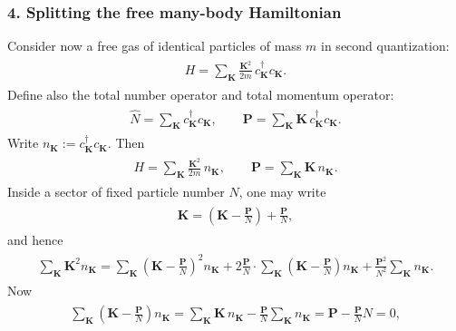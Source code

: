 \documentclass[../QFT_main.tex]{subfiles}
\begin{document}
\subsubsection*{4. Splitting the free many-body Hamiltonian}
Consider now a free gas of identical particles of mass $m$ in second quantization:
{\small\begin{align}
\begin{aligned}
    H=\sum_{\mathbf{K}}\frac{\mathbf{K}^2}{2m}\,c_{\mathbf{K}}^\dagger c_{\mathbf{K}}.
\end{aligned}
\end{align}}
Define also the total number operator and total momentum operator:
{\small\begin{align}
\begin{aligned}
    \hat N=\sum_{\mathbf{K}} c_{\mathbf{K}}^\dagger c_{\mathbf{K}},\qquad \mathbf{P}=\sum_{\mathbf{K}} \mathbf{K}\,c_{\mathbf{K}}^\dagger c_{\mathbf{K}}.
\end{aligned}
\end{align}}
Write $n_{\mathbf{K}}:=c_{\mathbf{K}}^\dagger c_{\mathbf{K}}$.
Then
{\small\begin{align}
\begin{aligned}
    H=\sum_{\mathbf{K}}\frac{\mathbf{K}^2}{2m}\,n_{\mathbf{K}},\qquad \mathbf{P}=\sum_{\mathbf{K}}\mathbf{K}\,n_{\mathbf{K}}.
\end{aligned}
\end{align}}
Inside a sector of fixed particle number $N$, one may write
{\small\begin{align}
\begin{aligned}
    \mathbf{K}=\left(\mathbf{K}-\frac{\mathbf{P}}{N}\right)+\frac{\mathbf{P}}{N},
\end{aligned}
\end{align}}
and hence
{\small\begin{align}
\begin{aligned}
    \sum_{\mathbf{K}}\mathbf{K}^2 n_{\mathbf{K}}=\sum_{\mathbf{K}}\left(\mathbf{K}-\frac{\mathbf{P}}{N}\right)^2 n_{\mathbf{K}}+2\frac{\mathbf{P}}{N}\cdot \sum_{\mathbf{K}}\left(\mathbf{K}-\frac{\mathbf{P}}{N}\right)n_{\mathbf{K}}+\frac{\mathbf{P}^2}{N^2}\sum_{\mathbf{K}}n_{\mathbf{K}}.
\end{aligned}
\end{align}}
Now
{\small\begin{align}
\begin{aligned}
    \sum_{\mathbf{K}}\left(\mathbf{K}-\frac{\mathbf{P}}{N}\right)n_{\mathbf{K}}=\sum_{\mathbf{K}}\mathbf{K}\,n_{\mathbf{K}}-\frac{\mathbf{P}}{N}\sum_{\mathbf{K}}n_{\mathbf{K}}=\mathbf{P}-\frac{\mathbf{P}}{N}N=0,
\end{aligned}
\end{align}}
\end{document}
